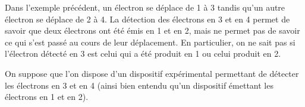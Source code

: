 \begin{minipage}[c]{.45\linewidth}

Dans l'exemple précédent, un électron se déplace de 1 à 3 tandis qu'un autre électron se déplace de 2 à 4. La détection des électrons en 3 et en 4 permet de savoir que deux électrons ont été émis en 1 et en 2, mais ne permet pas de savoir ce qui s'est passé au cours de leur déplacement. En particulier, on ne sait pas si l'électron détecté en 3 est celui qui a été produit en 1 ou celui produit en 2.



\end{minipage}
\hfill
\begin{minipage}[c]{.45\linewidth}
\end{minipage}

\vspace{0.9cm}
On suppose que l'on dispose d'un dispositif expérimental permettant de détecter les électrons en 3 et en 4 (ainsi bien entendu qu'un dispositif émettant les électrons en 1 et en 2). 


